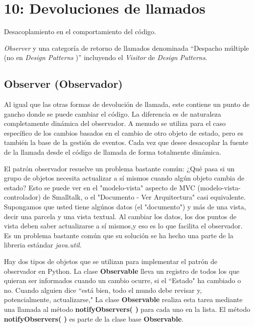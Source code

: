 
\section*{10: Devoluciones de llamados}
\label{sec:ddl}

Desacoplamiento en el comportamiento del código.  \newline

\textit{Observer} y una categoría de retorno de llamados denominada “Despacho múltiple (no en \textit{Design Patterns} )” incluyendo el \textit{Visitor} de \textit{Design Patterns}.   \newline

\subsection*{Observer (Observador)}
\label{subsec:Observer}

Al igual que las otras formas de devolución de llamada, este contiene un punto de gancho donde se puede cambiar el código. La diferencia es de naturaleza completamente dinámica del observador. A menudo se utiliza para el caso específico de los cambios basados en el cambio de otro objeto de estado, pero es también la base de la gestión de eventos. Cada vez que desee desacoplar la fuente de la llamada desde el código de llamada de forma totalmente dinámica.     \newline

El patrón observador resuelve un problema bastante común: ¿Qué pasa si un grupo de objetos necesita actualizar a sí mismos cuando algún objeto cambia de estado? Esto se puede ver en el "modelo-vista" aspecto de MVC (modelo-vista-controlador) de Smalltalk, o el "Documento - Ver Arquitectura" casi equivalente. Supongamos que usted tiene algúnos datos (el "documento") y más de una vista, decir una parcela y una vista textual. Al cambiar los datos, los dos puntos de vista deben saber actualizarse a sí mismos,y eso es lo que facilita el observador. Es un problema bastante común que su solución se ha hecho una parte de la libreria  estándar \textit{java.util}. \newline

Hay dos tipos de objetos que se utilizan para implementar el patrón de observador en Python. La clase \textbf{Observable} lleva un registro de todos los que quieran ser informados cuando un cambio ocurre, si el “Estado" ha cambiado o no. Cuando alguien dice “está bien, todo el mundo debe revisar y, potencialmente, actualizarse," La clase \textbf{Observable} realiza esta tarea mediante una llamada al método \textbf{notifyObservers( )} para cada uno en la lista. El método \textbf{notifyObservers( )} es parte de la clase base \textbf{Observable}.   \newline

